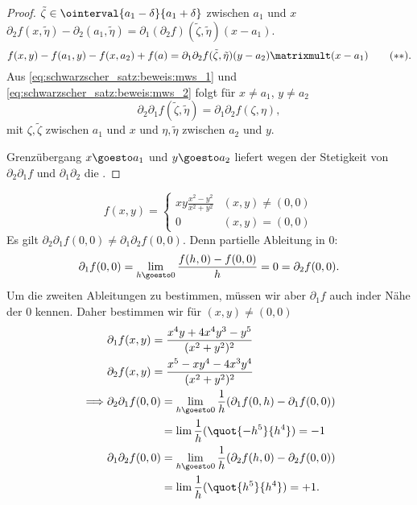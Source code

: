 \begin{proof}
  \texists \( \tilde{\zeta}\in \ointerval{a_1-\delta}{a_1+\delta} \) zwischen \( a_1  \) und \( x \) \sd\( \partial_2 f(x,\tilde{\eta})-\partial_2(a_1,\tilde{\eta})=\partial_1(\partial_2 f)(\tilde{\zeta},\tilde{\eta})(x-a_1) \).
  \begin{equation}
    f(x,y)-f(a_1,y)-f(x,a_2)+f(a)=\partial_1 \partial_2 f(\tilde{\zeta},\tilde{\eta})(y-a_2)\matrixmult(x-a_1)\tag{\(**\)}.\label{eq:schwarzscher_satz:beweis:mws_2}
  \end{equation}
  Aus \eqref{eq:schwarzscher_satz:beweis:mws_1} und \eqref{eq:schwarzscher_satz:beweis:mws_2} folgt für \( x\neq a_1 \), \( y\neq a_2 \)
  \begin{equation*}
    \partial_2 \partial_1 f(\tilde{\zeta},\tilde{\eta})=\partial_1 \partial_2 f(\zeta,\eta),
  \end{equation*}
  mit \( \zeta,\tilde{\zeta} \) zwischen \( a_1 \) und \( x \) und \( \eta,\tilde{\eta} \) zwischen \( a_2  \) und \( y \).

  Grenzübergang \( x\goesto a_1 \) und \( y\goesto a_2 \) liefert wegen der Stetigkeit von \( \partial_2\partial_1 f \) und \( \partial_1 \partial_2  \) die \Beh.
\end{proof}
\begin{antibeispiel*}
  \begin{equation*}
    f(x,y)=\begin{cases}
      xy\frac{x^2-y^2}{x^2+y^2}&(x,y)\neq (0,0)\\
      0 &(x,y)=(0,0)
    \end{cases}
  \end{equation*}
  Es gilt \( \partial_2 \partial_1 f(0,0)\neq \partial_1 \partial_2 f(0,0) \). Denn partielle Ableitung in \( 0 \):
  \begin{equation*}
    \partial_1 f(0,0)=\lim_{h \goesto 0}\frac{f(h,0)-f(0,0)}{h}=0=\partial_2 f(0,0).
  \end{equation*}
  Um die zweiten Ableitungen zu bestimmen, müssen wir aber \( \partial_1 f \) auch inder Nähe der \( 0 \) kennen. Daher bestimmen wir für \( (x,y)\neq (0,0) \)
  \begin{align*}
    &\begin{aligned}[t]
      \partial_1 f(x,y)&=\frac{x^4y+4x^4y^3-y^5}{(x^2+y^2)^2}\\
      \partial_2 f(x,y)&=\frac{x^5-xy^4-4x^3y^4}{(x^2+y^2)^2}
    \end{aligned}\\
    \implies &\begin{aligned}[t]
      \partial_2 \partial_1 f(0,0)&=\lim_{h \goesto 0}\frac{1}{h}(\partial_1 f(0,h)-\partial_1f(0,0))\\
      &=\lim \frac{1}{h}(\quot{-h^5}{h^4})=-1\\
      \partial_1 \partial_2 f(0,0)&=\lim_{h \goesto 0}\frac{1}{h}(\partial_2 f(h,0)-\partial_2 f(0,0))\\
      &=\lim \frac{1}{h}(\quot{h^5}{h^4})=+1.
    \end{aligned}
  \end{align*}
\end{antibeispiel*}
